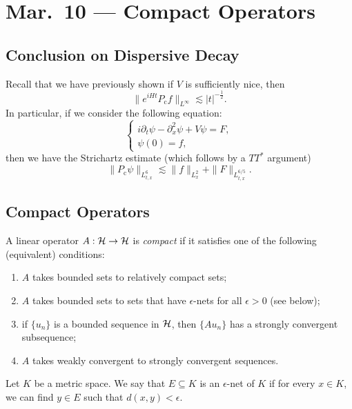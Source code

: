 \chapter{Mar.~10 --- Compact Operators}

\section{Conclusion on Dispersive Decay}
\begin{remark}
  Recall that we have previously shown if
  $V$ is sufficiently nice, then
  \[
    \|e^{iHt} P_{\mathrm{c}} f\|_{L^\infty}
    \lesssim |t|^{-\frac{1}{2}}.
  \]
  In particular, if we consider the following equation:
  \[
    \begin{cases}
      i \partial_t \psi - \partial_x^2 \psi + V \psi = F, \\
      \psi(0) = f,
    \end{cases}
  \]
  then we have the Strichartz estimate (which
  follows by a $TT^*$ argument)
  \[
    \|P_{\mathrm{c}} \psi\|_{L^6_{t, x}} \lesssim \|f\|_{L^2_x} + \|F\|_{L^{6 / 5}_{t, x}}.
  \]
\end{remark}

\section{Compact Operators}

\begin{definition}
  A linear operator $A : \mathcal{H} \to \mathcal{H}$ is \emph{compact}
  if it satisfies one of the following (equivalent)
  conditions:
  \begin{enumerate}
    \item $A$ takes bounded sets to relatively
      compact sets;
    \item $A$ takes bounded sets to sets that
      have $\epsilon$-nets for all $\epsilon > 0$ (see below);
    \item if $\{u_n\}$ is a bounded sequence in
      $\mathcal{H}$, then $\{A u_n\}$ has a strongly
      convergent subsequence;
    \item $A$ takes weakly convergent to strongly
      convergent sequences.
  \end{enumerate}
\end{definition}

\begin{definition}
  Let $K$ be a metric space. We say that $E \subseteq K$
  is an $\epsilon$-net of $K$ if for every $x \in K$,
  we can find $y \in E$ such that $d(x, y) < \epsilon$.
\end{definition}

